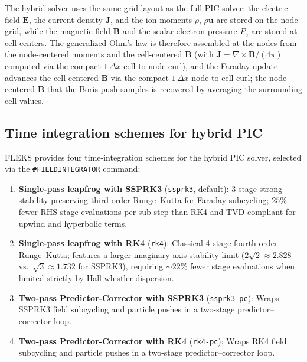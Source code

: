\documentclass[a4paper, 11pt]{article}
\begin{document}
The hybrid solver uses the same grid layout as the full-PIC solver: the electric field $\mathbf{E}$, the current density $\mathbf{J}$, and the ion moments $\rho$, $\rho\mathbf{u}$ are stored on the node grid, while the magnetic field $\mathbf{B}$ and the scalar electron pressure $P_e$ are stored at cell centers. The generalized Ohm's law is therefore assembled at the nodes from the node-centered moments and the cell-centered $\mathbf{B}$ (with $\mathbf{J} = \nabla\times\mathbf{B}/(4\pi)$ computed via the compact $1\,\Delta x$ cell-to-node curl), and the Faraday update advances the cell-centered $\mathbf{B}$ via the compact $1\,\Delta x$ node-to-cell curl; the node-centered $\mathbf{B}$ that the Boris push samples is recovered by averaging the surrounding cell values.

\subsection{Time integration schemes for hybrid PIC}
\label{sec:hybrid_timestepping}

FLEKS provides four time-integration schemes for the hybrid PIC solver, selected via the \texttt{\#FIELDINTEGRATOR} command:
\begin{enumerate}
  \item \textbf{Single-pass leapfrog with SSPRK3} (\texttt{ssprk3}, default): 3-stage strong-stability-preserving third-order Runge--Kutta for Faraday subcycling; $25\%$ fewer RHS stage evaluations per sub-step than RK4 and TVD-compliant for upwind and hyperbolic terms.
  \item \textbf{Single-pass leapfrog with RK4} (\texttt{rk4}): Classical 4-stage fourth-order Runge--Kutta; features a larger imaginary-axis stability limit ($2\sqrt{2} \approx 2.828$ vs.\ $\sqrt{3} \approx 1.732$ for SSPRK3), requiring $\sim 22\%$ fewer stage evaluations when limited strictly by Hall-whistler dispersion.
  \item \textbf{Two-pass Predictor-Corrector with SSPRK3} (\texttt{ssprk3-pc}): Wraps SSPRK3 field subcycling and particle pushes in a two-stage predictor--corrector loop.
  \item \textbf{Two-pass Predictor-Corrector with RK4} (\texttt{rk4-pc}): Wraps RK4 field subcycling and particle pushes in a two-stage predictor--corrector loop.
\end{enumerate}
\end{document}
